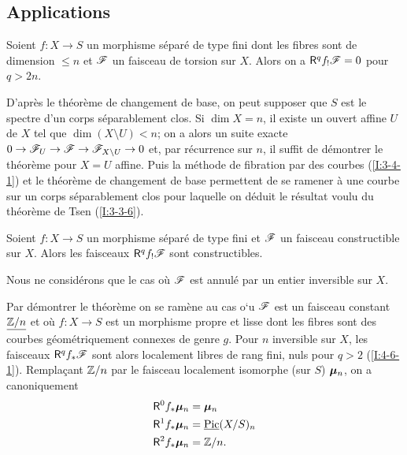 \documentclass[oneside]{book}
\begin{document}
\subsection{Applications}\label{I:4-6}





\begin{theorem}[d'annulation]\label{I:4-6-1}
Soient $f:X\to S$ un morphisme séparé de type fini dont les fibres sont de 
dimension $\leqslant n$ et $\mathscr{F}$ un faisceau de torsion sur $X$. Alors on a 
$\mathsf{R}^q f_! \mathscr{F} = 0$ pour $q>2 n$. 
\end{theorem}

D'après le théorème de changement de base, on peut supposer que $S$ est 
le spectre d'un corps séparablement clos. Si $\dim X = n$, il existe un 
ouvert affine $U$ de $X$ tel que $\dim(X\setminus U) < n$; on a alors un suite 
exacte $0\to \mathscr{F}_U \to \mathscr{F} \to \mathscr{F}_{X\setminus U} \to 0$ et, par récurrence sur $n$, 
il suffit de démontrer le théorème pour $X=U$ affine. Puis la méthode de 
fibration par des courbes (\ref{I:3-4-1}) et le théorème de changement de 
base permettent de se ramener à une courbe sur un corps séparablement clos 
pour laquelle on déduit le résultat voulu du théorème de Tsen 
(\ref{I:3-3-6}). 





\begin{theorem}[de finitude]\label{I:4-6-2}
Soient $f:X\to S$ un morphisme séparé de type fini et $\mathscr{F}$ un faisceau 
constructible sur $X$. Alors les faisceaux $\mathsf{R}^q f_! \mathscr{F}$ sont constructibles. 
\end{theorem}

Nous ne considérons que le cas où $\mathscr{F}$ est annulé par un entier inversible 
sur $X$. 

Par démontrer le théorème on se ramène au cas o`u $\mathscr{F}$ est un faisceau 
constant $\underline{\mathbb{Z}/n}$ et où $f:X\to S$ est un morphisme propre et lisse 
dont les fibres sont des courbes géométriquement connexes de genre $g$. 
Pour $n$ inversible sur $X$, les faisceaux $\mathsf{R}^q f_* \mathscr{F}$ sont alors localement 
libres de rang fini, nuls pour $q>2$ (\ref{I:4-6-1}). Remplaçant $\mathbb{Z}/n$ par le 
faisceau localement isomorphe (sur $S$) ${\bm\mu}_n$, on a canoniquement 
\begin{equation}\label{I:eq:4}
\begin{aligned}
  \mathsf{R}^0 f_* {\bm\mu}_n &= {\bm\mu}_n \\
  \mathsf{R}^1 f_* {\bm\mu}_n &= \underline{\operatorname{Pic}}(X/S)_n \\
  \mathsf{R}^2 f_* {\bm\mu}_n &= \mathbb{Z}/n \text{.}
\end{aligned}
\end{equation}
\end{document}
